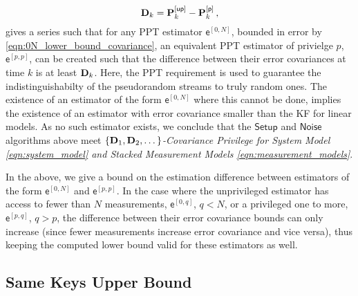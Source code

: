 \documentclass[conference]{IEEEtran}
\theoremstyle{definition}
\theoremstyle{remark}
\begin{document}
\begin{equation}
  {\ensuremath{{\mathbf{D}}}}_k = {{\mathbf{P}}}_k^{[\mathsf{up}]} - {{\mathbf{P}}}_k^{[\mathsf{p}]}\,,
\end{equation}
gives a series such that for any PPT estimator $\mathsf{e}^{[0,N]}$, bounded in error by \eqref{eqn:0N_lower_bound_covariance}, an equivalent PPT estimator of privielge $p$, $\mathsf{e}^{[p,p]}$, can be created such that the difference between their error covariances at time $k$ is at least ${{\mathbf{D}}}_k$. Here, the PPT requirement is used to guarantee the indistinguishabilty of the pseudorandom streams to truly random ones. The existence of an estimator of the form $\mathsf{e}^{[0,N]}$ where this cannot be done, implies the existence of an estimator with error covariance smaller than the KF for linear models. As no such estimator exists, we conclude that the $\mathsf{Setup}$ and $\mathsf{Noise}$ algorithms above meet \textit{$\{{{\mathbf{D}}}_1,{{\mathbf{D}}}_2,\dots\}$-Covariance Privilege for System Model \eqref{eqn:system_model} and Stacked Measurement Models \eqref{eqn:measurement_models}}.

In the above, we give a bound on the estimation difference between estimators of the form $\mathsf{e}^{[0,N]}$ and $\mathsf{e}^{[p,p]}$. In the case where the unprivileged estimator has access to fewer than $N$ measurements, $\mathsf{e}^{[0,q]}$, $q<N$, or a privileged one to more, $\mathsf{e}^{[p,q]}$, $q>p$, the difference between their error covariance bounds can only increase (since fewer measurements increase error covariance and vice versa), thus keeping the computed lower bound valid for these estimators as well.

% 
% 

\subsection{Same Keys Upper Bound}\label{subsec:crypto_same_keys_upper_bound}
\end{document}

